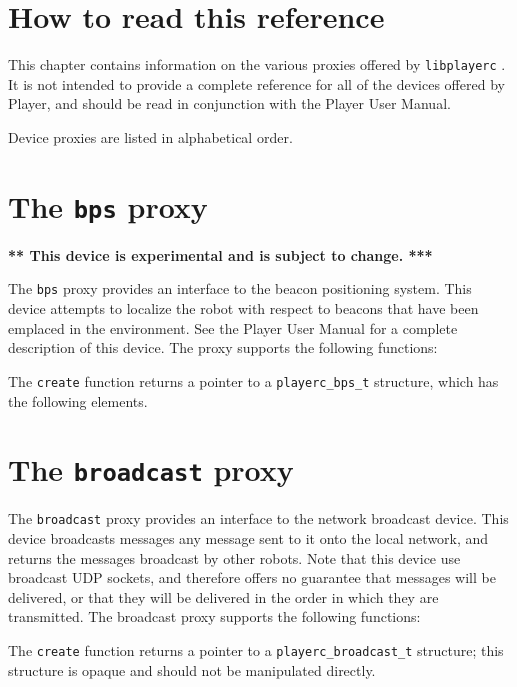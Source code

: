 \documentclass[11pt]{report}
\def\libplayerc {{\tt libplayerc} }
\begin{document}
\section{How to read this reference}

This chapter contains information on the various proxies offered by
\libplayerc.  It is not intended to provide a complete reference for
all of the devices offered by Player, and should be read in
conjunction with the Player User Manual.

Device proxies are listed in alphabetical order.


\newpage
\section{The {\tt bps} proxy}

{\bf *** This device is experimental and is subject to change. ***}

\noindent The {\tt bps} proxy provides an interface to the beacon positioning
system.  This device attempts to localize the robot with respect to
beacons that have been emplaced in the environment.  See the Player
User Manual for a complete description of this device.  The proxy
supports the following functions:
\begin{quote}

\end{quote}
The {\tt create} function returns a pointer to a {\tt playerc\_bps\_t}
structure, which has the following elements.
\begin{quote}

\end{quote}


\newpage
\section{The {\tt broadcast} proxy}

The {\tt broadcast} proxy provides an interface to the network
broadcast device.  This device broadcasts messages any message sent to
it onto the local network, and returns the messages broadcast by other
robots.  Note that this device use broadcast UDP sockets, and
therefore offers no guarantee that messages will be delivered, or that
they will be delivered in the order in which they are transmitted.
The broadcast proxy supports the following functions:
\begin{quote}

\end{quote}
The {\tt create} function returns a pointer to a {\tt playerc\_broadcast\_t}
structure; this structure is opaque and should not be manipulated directly.
\end{document}
